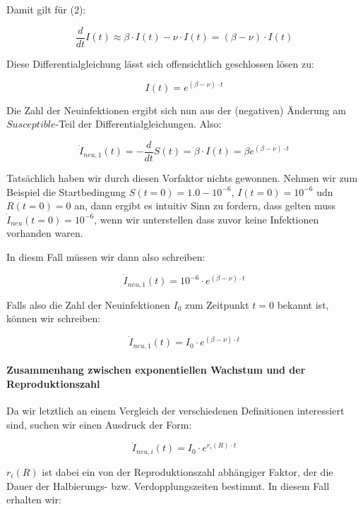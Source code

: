 \documentclass[a4paper]{article}
\begin{document}
    Damit gilt für (2):

    $$ \frac{d}{dt}I(t) \approx \beta \cdot I(t) - \nu \cdot I(t) = (\beta - \nu) \cdot I(t) $$

    Diese Differentialgleichung lässt sich offensichtlich geschlossen lösen zu: 

    \begin{equation}
        I(t) = e^{(\beta - \nu) \cdot t}
    \end{equation}

    Die Zahl der Neuinfektionen ergibt sich nun aus der (negativen) Änderung am $Susceptible$-Teil der Differentialgleichungen. Also: 

    \begin{equation}
        \dot{I}_{neu,1}(t) = - \frac{d}{dt}S(t) = \beta \cdot I(t) = \beta e^{(\beta - \nu) \cdot t}
    \end{equation}

    Tatsächlich haben wir durch diesen Vorfaktor nichts gewonnen. Nehmen wir zum Beispiel die Startbedingung $S(t=0) = 1.0-10^{-6}$, $I(t=0) = 10^{-6}$ udn $R(t=0) = 0$ an, dann ergibt es intuitiv Sinn zu fordern, dass gelten muss $\dot{I}_{neu}(t=0) = 10^{-6}$, wenn wir unterstellen dass zuvor keine Infektionen vorhanden waren.

    In diesm Fall müssen wir dann also schreiben: 
    
    $$ \dot{I}_{neu,1}(t) = 10^{-6} \cdot e^{(\beta - \nu) \cdot t} $$

    Falls also die Zahl der Neuinfektionen $I_0$ zum Zeitpunkt $t=0$ bekannt ist, können wir schreiben: 

    \begin{equation}
        \dot{I}_{neu,1}(t) = I_{0} \cdot e^{(\beta - \nu) \cdot t}
    \end{equation}

    \paragraph{Zusammenhang zwischen exponentiellen Wachstum und der Reproduktionszahl}Da wir letztlich an einem Vergleich der verschiedenen Definitionen interessiert sind, suchen wir einen Ausdruck der Form: 

    \begin{equation}
        \dot{I}_{neu,i}(t) = I_{0} \cdot e^{r_{i}(R) \cdot t}
    \end{equation}

    $r_{i}(R)$ ist dabei ein von der Reproduktionszahl abhängiger Faktor, der die Dauer der Halbierungs- bzw. Verdopplungszeiten bestimmt. In diesem Fall erhalten wir: 
\end{document}
